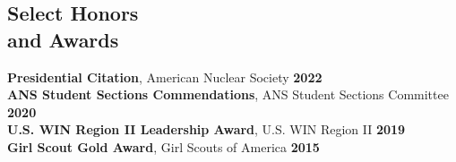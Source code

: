 \documentclass[margin,line]{resume}
\begin{document}
\begin{resume}
    \section{\mysidestyle Select Honors \\and Awards}
    \textbf{Presidential Citation}, American Nuclear Society \hfill \textbf{2022}\vspace{.5mm}\\
    \textbf{ANS Student Sections Commendations}, ANS Student Sections Committee \hfill \textbf{2020}\vspace{.5mm}\\%
    \textbf{U.S. WIN Region II Leadership Award}, U.S. WIN Region II \hfill \textbf{2019}\vspace{.5mm}\\%
    \textbf{Girl Scout Gold Award}, Girl Scouts of America \hfill \textbf{2015}\vspace{.5mm}\\%
    \vspace{-7mm}


\end{resume}
\end{document}
